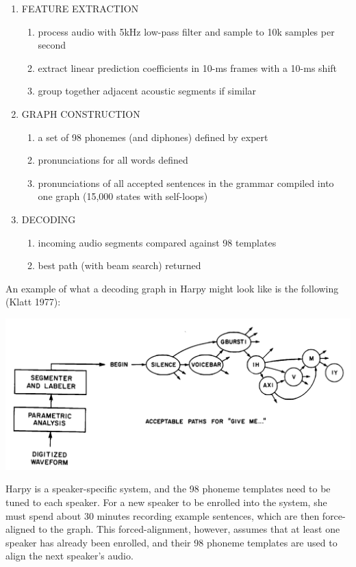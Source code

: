 \documentclass[10pt,a4paper]{article}
\begin{document}
\begin{enumerate}
\item FEATURE EXTRACTION
  \begin{enumerate}
  \item process audio with 5kHz low-pass filter and sample to 10k samples per second 
  \item extract linear prediction coefficients in 10-ms frames with a 10-ms shift
  \item group together adjacent acoustic segments if similar
  \end{enumerate}
  
\item GRAPH CONSTRUCTION
  \begin{enumerate}
  \item a set of 98 phonemes (and diphones) defined by expert
  \item pronunciations for all words defined
  \item pronunciations of all accepted sentences in the grammar compiled into one graph (15,000 states with self-loops)
  \end{enumerate}

\item DECODING
  \begin{enumerate}
  \item incoming audio segments compared against 98 templates
  \item best path (with beam search) returned
  \end{enumerate}
\end{enumerate}

An example of what a decoding graph in Harpy might look like is the following (Klatt 1977):


\begin{center}
\includegraphics[width=.9\textwidth,keepaspectratio]{figs/harpy-graph.png}
\end{center}


Harpy is a speaker-specific system, and the 98 phoneme templates need to be tuned to each speaker. For a new speaker to be enrolled into the system, she must spend about 30 minutes recording example sentences, which are then force-aligned to the graph. This forced-alignment, however, assumes that at least one speaker has already been enrolled, and their 98 phoneme templates are used to align the next speaker's audio.
\end{document}
